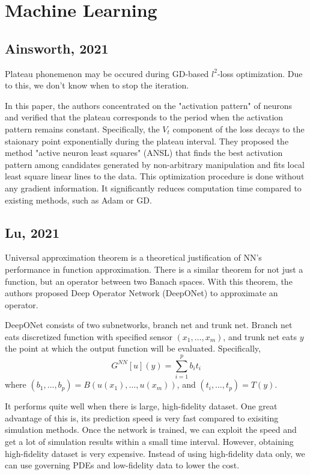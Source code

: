 \section{Machine Learning}

\subsection{Ainsworth, 2021 \cite{ainsworth2021}}

Plateau phonemenon may be occured during GD-based $l^2$-loss optimization.
Due to this, we don't know when to stop the iteration.

In this paper, the authors concentrated on the "activation pattern" of neurons
and verified that the plateau corresponds to the period when the activation pattern remains constant.
Specifically, 
the $V_t$ component of the loss decays to the staionary point exponentially 
during the plateau interval.
They proposed the method "active neuron least squares" (ANSL)
that finds the best activation pattern among candidates generated by non-arbitrary manipulation
and fits local least square linear lines to the data.
This optimization procedure is done without any gradient information.
It significantly reduces computation time compared to existing methods, such as Adam or GD.

\subsection{Lu, 2021 \cite{DeepONet}}
Universal approximation theorem is a theoretical justification of NN's performance in function approximation.
There is a similar theorem for not just a function, but an operator between two Banach spaces.
With this theorem, the authors proposed Deep Operator Network (DeepONet) to approximate an operator.

DeepONet consists of two subnetworks, branch net and trunk net.
Branch net eats discretized function with specified sensor $(x_1, \dots, x_m)$,
and trunk net eats $y$ the point at which the output function will be evaluated.
Specifically,
\[
    G^{NN}[u](y) = \sum_{i =1}^p b_i t_i
\]
where $(b_1, \dots, b_p) = B(u(x_1), \dots, u(x_m))$,
and $(t_i, \dots, t_p) = T(y)$.

It performs quite well when there is large, high-fidelity dataset.
One great advantage of this is, 
its prediction speed is very fast compared to exisiting simulation methods.
Once the network is trained, we can exploit the speed and get a lot of simulation results within a small time interval.
However, obtaining high-fidelity dataset is very expensive.
Instead of using high-fidelity data only,
we can use governing PDEs and low-fidelity data to lower the cost.

